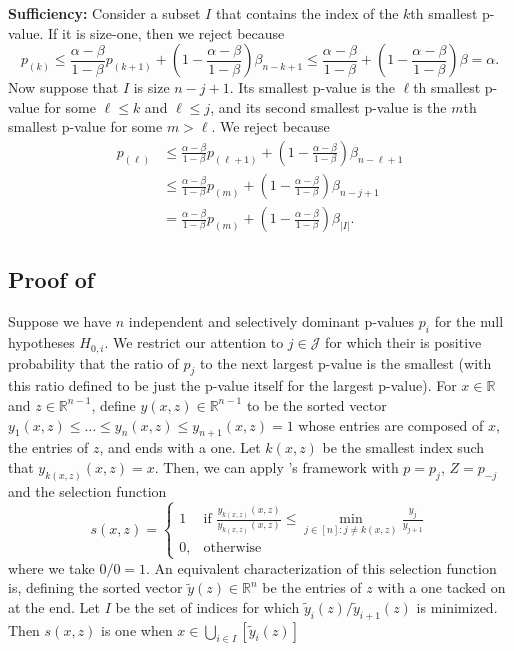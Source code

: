 \documentclass{article}
\newcommand{\R}{\mathbb{R}}
\begin{document}
\begin{appendix}
\noindent \textbf{Sufficiency: } Consider a subset $I$ that contains the index of the $k$th smallest p-value. If it is size-one, then we reject because 
\begin{equation*}
    p_{(k)} \leq \frac{\alpha - \beta}{1-\beta}p_{(k + 1)} + \left(1 - \frac{\alpha - \beta}{1-\beta} \right) \beta_{n - k + 1} \leq \frac{\alpha - \beta}{1-\beta} + \left(1 - \frac{\alpha - \beta}{1-\beta} \right)\beta = \alpha. 
\end{equation*}
Now suppose that $I$ is size $n-j+1$.  Its smallest p-value is the $\ell$th smallest p-value for some $\ell \leq k$ and $\ell \leq j$, and its second smallest p-value is the $m$th smallest p-value for some $m > \ell$. We reject because 
\begin{align*}
    p_{(\ell)} &\leq \frac{\alpha-\beta}{1-\beta} p_{(\ell + 1)} + \left(1 - \frac{\alpha - \beta}{1-\beta} \right)\beta_{ n - \ell + 1}\\
    &\leq \frac{\alpha-\beta}{1-\beta} p_{(m)} + \left(1 - \frac{\alpha - \beta}{1-\beta} \right)\beta_{ n - j + 1} \\
    &= \frac{\alpha-\beta}{1-\beta} p_{(m)} + \left(1 - \frac{\alpha - \beta}{1-\beta} \right)\beta_{|I|}.
\end{align*}

\subsection{Proof of }


Suppose we have $n$ independent and selectively dominant p-values $p_i$ for the null hypotheses $H_{0, i}$. We restrict our attention to $j \in \mathcal{J}$ for which their is positive probability that the ratio of $p_j$ to the next largest p-value is the smallest (with this ratio defined to be just the p-value itself for the largest p-value). For $x \in \R$ and $z \in \R^{n-1}$, define $y(x, z) \in \R^{n-1}$ to be the sorted vector $y_1(x, z) \leq \dots \leq y_n(x, z) \leq y_{n+1}(x, z) = 1$ whose entries are composed of $x$, the entries of $z$, and ends with a one. Let $k(x, z)$ be the smallest index such that $y_{k(x, z)}(x, z) = x$. Then, we can apply 's framework with $p=p_j$, $Z = p_{-j}$ and the selection function 
\begin{equation*}
s(x, z) =
\begin{cases}
1 & \text{if } \frac{y_{k(x, z)}(x, z)}{y_{k(x, z)}(x, z)} \leq \min_{j \in [n]: j \neq k(x, z)} \frac{y_j}{y_{j + 1}} \\
0, & \text{otherwise}
\end{cases}
\end{equation*}
where we take $0/0 = 1$. An equivalent characterization of this selection function is, defining the sorted vector $\tilde{y}(z) \in \R^n$ be the entries of $z$ with a one tacked on at the end. Let $I$ be the set of indices for which $\tilde{y}_i(z)/\tilde{y}_{i+1}(z)$ is minimized. Then $s(x, z)$ is one when $x \in \bigcup_{i \in I} [\tilde{y}_i(z)]  $


\end{appendix}
\end{document}
